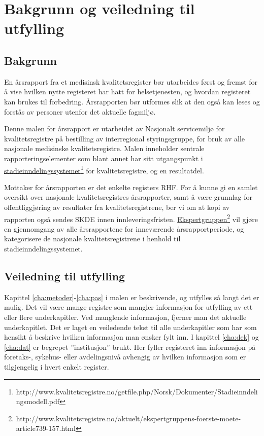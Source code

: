 \documentclass[norsk, a4paper, twocolumn]{report}
\begin{document}

\chapter*{Bakgrunn og veiledning til utfylling}

\section*{Bakgrunn}
En årsrapport fra et medisinsk kvalitetsregister bør utarbeides først og
fremst for å vise hvilken nytte registeret har hatt for helsetjenesten, og
hvordan registeret kan brukes til forbedring. Årsrapporten bør utformes slik
at den også kan leses og forstås av personer utenfor det aktuelle fagmiljø.

Denne malen for årsrapport er utarbeidet av Nasjonalt servicemiljø for
kvalitetsregistre på bestilling av interregional styringsgruppe, for bruk av alle
nasjonale medisinske kvalitetsregistre. Malen inneholder sentrale
rapporteringselementer som blant annet har sitt utgangspunkt i
\href{http://www.kvalitetsregistre.no/getfile.php/Norsk/Dokumenter/Stadieinndelingsmodell.pdf}{stadieinndelingssystemet}\footnote{http://www.kvalitetsregistre.no/getfile.php/Norsk/Dokumenter/Stadieinndelingsmodell.pdf}
for kvalitetsregistre, og en resultatdel.

Mottaker for årsrapporten er det enkelte registers RHF. For å kunne gi en
samlet oversikt over nasjonale kvalitetsregistres
årsrapporter, samt å være grunnlag for offentliggjøring av resultater fra
kvalitetsregistrene, ber vi om at kopi av rapporten også sendes SKDE innen
innleveringsfristen.
\href{http://www.kvalitetsregistre.no/aktuelt/ekspertgruppens-foerste-moete-article739-157.html}{Ekspertgruppen}\footnote{http://www.kvalitetsregistre.no/aktuelt/ekspertgruppens-foerste-moete-article739-157.html}
vil gjøre en gjennomgang av alle årsrapportene for inneværende
årsrapportperiode, og kategorisere de nasjonale kvalitetsregistrene i henhold
til stadieinndelingssystemet.



\section*{Veiledning til utfylling}

Kapittel \ref{cha:metoder}-\ref{cha:pas} i malen er beskrivende, og utfylles så
langt det er mulig. Det vil
være mange registre som mangler informasjon for utfylling av ett eller flere
underkapitler. Ved manglende informasjon, fjerner man det aktuelle
underkapitlet. Det er laget en veiledende tekst til alle underkapitler som har
som hensikt å beskrive hvilken informasjon man ønsker fylt inn. I kapittel
\ref{cha:dek} og \ref{cha:dat}
er begrepet ”institusjon” brukt. Her fyller registeret inn informasjon på
foretaks-, sykehus- eller avdelingsnivå avhengig av hvilken informasjon som er
tilgjengelig i hvert enkelt register. 
\end{document}
